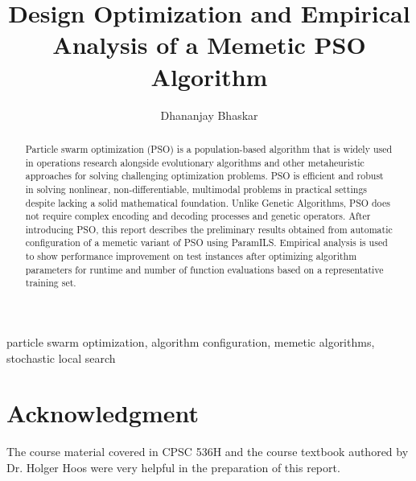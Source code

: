 \documentclass[12pt]{article}
\title{Design Optimization and Empirical Analysis of a Memetic PSO Algorithm}
\author{Dhananjay Bhaskar\footnotemark[1]}
\date{}
\begin{document}

\maketitle

\renewcommand{\thefootnote}{\fnsymbol{footnote}}

 
\begin{abstract}
Particle swarm optimization (PSO) is a population-based algorithm that is widely used in operations research alongside evolutionary algorithms and other metaheuristic approaches for solving challenging optimization problems. PSO is efficient and robust in solving nonlinear, non-differentiable, multimodal problems in practical settings despite lacking a solid mathematical foundation. Unlike Genetic Algorithms, PSO does not require complex encoding and decoding processes and genetic operators. After introducing PSO, this report describes the preliminary results obtained from automatic configuration of a memetic variant of PSO using ParamILS. Empirical analysis is used to show performance improvement on test instances after optimizing algorithm parameters for runtime and number of function evaluations based on a representative training set.
\end{abstract}

\vspace{4mm}  particle swarm optimization, algorithm configuration, memetic algorithms, stochastic local search

















\section{Acknowledgment} The course material covered in CPSC 536H and the course textbook authored by Dr. Holger Hoos were very helpful in the preparation of this report.
\end{document}
